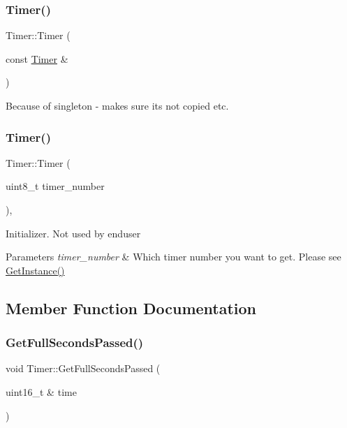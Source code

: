 \subsubsection{\texorpdfstring{Timer()}{Timer()}\hspace{0.1cm}{\footnotesize\ttfamily [1/2]}}
{\footnotesize\ttfamily Timer\+::\+Timer (\begin{DoxyParamCaption}\item[{const \hyperlink{class_timer}{Timer} \&}]{ }\end{DoxyParamCaption})\hspace{0.3cm}{\ttfamily [delete]}}

Because of singleton -\/ makes sure its not copied etc. \hypertarget{class_timer_a609e586dbc0fdc159fc6fd490fcc1ae3}{}\label{class_timer_a609e586dbc0fdc159fc6fd490fcc1ae3} 
\subsubsection{\texorpdfstring{Timer()}{Timer()}\hspace{0.1cm}{\footnotesize\ttfamily [2/2]}}
{\footnotesize\ttfamily Timer\+::\+Timer (\begin{DoxyParamCaption}\item[{uint8\+\_\+t}]{timer\+\_\+number }\end{DoxyParamCaption})\hspace{0.3cm}{\ttfamily [inline]}, {\ttfamily [private]}}

Initializer. Not used by enduser 
\begin{DoxyParams}{Parameters}
{\em timer\+\_\+number} & Which timer number you want to get. Please see \hyperlink{class_timer_a5a9960ef2a5394a76b4b024cae1a86a3}{Get\+Instance()} \\
\hline
\end{DoxyParams}


\subsection{Member Function Documentation}
\hypertarget{class_timer_ad45285aacc47697bea2bd0dce06a3e4d}{}\label{class_timer_ad45285aacc47697bea2bd0dce06a3e4d} 
\subsubsection{\texorpdfstring{Get\+Full\+Seconds\+Passed()}{GetFullSecondsPassed()}}
{\footnotesize\ttfamily void Timer\+::\+Get\+Full\+Seconds\+Passed (\begin{DoxyParamCaption}\item[{uint16\+\_\+t \&}]{time }\end{DoxyParamCaption})}

